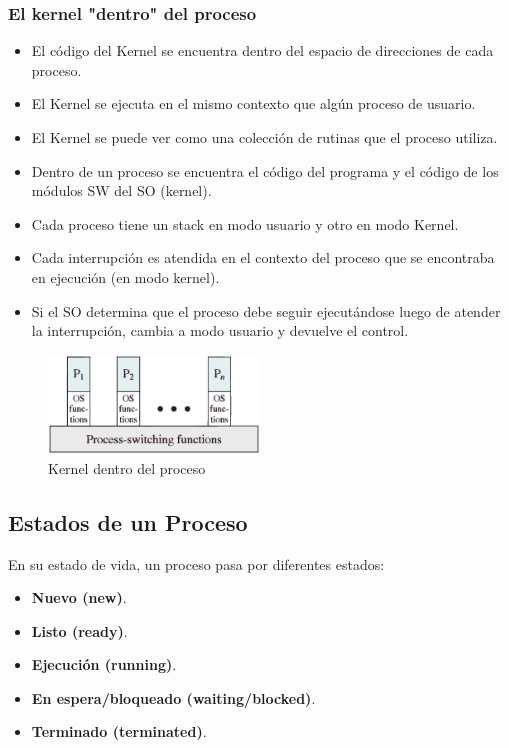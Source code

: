 \subsubsection{El kernel "dentro" del proceso}
\begin{itemize}
    \item El código del Kernel se encuentra dentro del espacio de direcciones de cada proceso.
    \item El Kernel se ejecuta en el mismo contexto que algún proceso de usuario.
    \item El Kernel se puede ver como una colección de rutinas que el proceso utiliza.
    \item Dentro de un proceso se encuentra el código del programa y el código de los módulos SW del SO (kernel).
    \item Cada proceso tiene un stack en modo usuario y otro en modo Kernel. 
    \item Cada interrupción es atendida en el contexto del proceso que se encontraba en ejecución (en modo kernel).
    \item Si el SO determina que el proceso debe seguir ejecutándose luego de atender la interrupción, cambia a modo usuario y devuelve el control.
\end{itemize}
\vspace{1cm}
\begin{figure}[ht]
    \begin{center}
        \includegraphics[width=0.50\textwidth]{assets/Kernel2.eps}
    \end{center}
    \caption{Kernel dentro del proceso}\label{fig:}
\end{figure}

\subsection{Estados de un Proceso}
En su estado de vida, un proceso pasa por diferentes estados:
\begin{itemize}
    \item \textbf{Nuevo (new)}.
    \item \textbf{Listo (ready)}.
    \item \textbf{Ejecución (running)}.
    \item \textbf{En espera/bloqueado (waiting/blocked)}.
    \item \textbf{Terminado (terminated)}.
\end{itemize}

